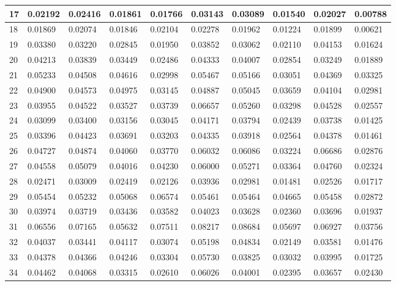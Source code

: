 \begin{table}[H]
{\begin{tabular}{|l|l|l|l|l|l|l|l|l|l|}
        17 & 0.02192 & 0.02416 & 0.01861 & 0.01766 & 0.03143 & 0.03089 & 0.01540 & 0.02027 & 0.00788 \\ \hline
        18 & 0.01869 & 0.02074 & 0.01846 & 0.02104 & 0.02278 & 0.01962 & 0.01224 & 0.01899 & 0.00621 \\ \hline
        19 & 0.03380 & 0.03220 & 0.02845 & 0.01950 & 0.03852 & 0.03062 & 0.02110 & 0.04153 & 0.01624 \\ \hline
        20 & 0.04213 & 0.03839 & 0.03449 & 0.02486 & 0.04333 & 0.04007 & 0.02854 & 0.03249 & 0.01889 \\ \hline
        21 & 0.05233 & 0.04508 & 0.04616 & 0.02998 & 0.05467 & 0.05166 & 0.03051 & 0.04369 & 0.03325 \\ \hline
        22 & 0.04900 & 0.04573 & 0.04975 & 0.03145 & 0.04887 & 0.05045 & 0.03659 & 0.04104 & 0.02981 \\ \hline
        23 & 0.03955 & 0.04522 & 0.03527 & 0.03739 & 0.06657 & 0.05260 & 0.03298 & 0.04528 & 0.02557 \\ \hline
        24 & 0.03099 & 0.03400 & 0.03156 & 0.03045 & 0.04171 & 0.03794 & 0.02439 & 0.03738 & 0.01425 \\ \hline
        25 & 0.03396 & 0.04423 & 0.03691 & 0.03203 & 0.04335 & 0.03918 & 0.02564 & 0.04378 & 0.01461 \\ \hline
        26 & 0.04727 & 0.04874 & 0.04060 & 0.03770 & 0.06032 & 0.06086 & 0.03224 & 0.06686 & 0.02876 \\ \hline
        27 & 0.04558 & 0.05079 & 0.04016 & 0.04230 & 0.06000 & 0.05271 & 0.03364 & 0.04760 & 0.02324 \\ \hline
        28 & 0.02471 & 0.03009 & 0.02419 & 0.02126 & 0.03936 & 0.02981 & 0.01481 & 0.02526 & 0.01717 \\ \hline
        29 & 0.05454 & 0.05232 & 0.05068 & 0.06574 & 0.05461 & 0.05464 & 0.04665 & 0.05458 & 0.02872 \\ \hline
        30 & 0.03974 & 0.03719 & 0.03436 & 0.03582 & 0.04023 & 0.03628 & 0.02360 & 0.03696 & 0.01937 \\ \hline
        31 & 0.06556 & 0.07165 & 0.05632 & 0.07511 & 0.08217 & 0.08684 & 0.05697 & 0.06927 & 0.03756 \\ \hline
        32 & 0.04037 & 0.03441 & 0.04117 & 0.03074 & 0.05198 & 0.04834 & 0.02149 & 0.03581 & 0.01476 \\ \hline
        33 & 0.04378 & 0.04366 & 0.04246 & 0.03304 & 0.05730 & 0.03825 & 0.03032 & 0.03995 & 0.01725 \\ \hline
        34 & 0.04462 & 0.04068 & 0.03315 & 0.02610 & 0.06026 & 0.04001 & 0.02395 & 0.03657 & 0.02430 \\ \hline

\end{tabular}}
\end{table}
